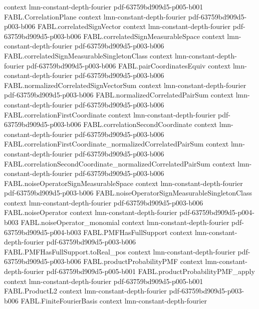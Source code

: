 \begin{theorem}
  {context}
  {lmn-constant-depth-fourier}
  {pdf-63759bd909d5-p005-b001}
\proofstep
  {FABL.CorrelationPlane}
  {context}
  {lmn-constant-depth-fourier}
  {pdf-63759bd909d5-p003-b006}
\proofstep
  {FABL.correlatedSignVector}
  {context}
  {lmn-constant-depth-fourier}
  {pdf-63759bd909d5-p003-b006}
\proofstep
  {FABL.correlatedSignMeasurableSpace}
  {context}
  {lmn-constant-depth-fourier}
  {pdf-63759bd909d5-p003-b006}
\proofstep
  {FABL.correlatedSignMeasurableSingletonClass}
  {context}
  {lmn-constant-depth-fourier}
  {pdf-63759bd909d5-p003-b006}
\proofstep
  {FABL.pairCoordinatesEquiv}
  {context}
  {lmn-constant-depth-fourier}
  {pdf-63759bd909d5-p003-b006}
\proofstep
  {FABL.normalizedCorrelatedSignVectorSum}
  {context}
  {lmn-constant-depth-fourier}
  {pdf-63759bd909d5-p003-b006}
\proofstep
  {FABL.normalizedCorrelatedPairSum}
  {context}
  {lmn-constant-depth-fourier}
  {pdf-63759bd909d5-p003-b006}
\proofstep
  {FABL.correlationFirstCoordinate}
  {context}
  {lmn-constant-depth-fourier}
  {pdf-63759bd909d5-p003-b006}
\proofstep
  {FABL.correlationSecondCoordinate}
  {context}
  {lmn-constant-depth-fourier}
  {pdf-63759bd909d5-p003-b006}
\proofstep
  {FABL.correlationFirstCoordinate_normalizedCorrelatedPairSum}
  {context}
  {lmn-constant-depth-fourier}
  {pdf-63759bd909d5-p003-b006}
\proofstep
  {FABL.correlationSecondCoordinate_normalizedCorrelatedPairSum}
  {context}
  {lmn-constant-depth-fourier}
  {pdf-63759bd909d5-p003-b006}
\proofstep
  {FABL.noiseOperatorSignMeasurableSpace}
  {context}
  {lmn-constant-depth-fourier}
  {pdf-63759bd909d5-p003-b006}
\proofstep
  {FABL.noiseOperatorSignMeasurableSingletonClass}
  {context}
  {lmn-constant-depth-fourier}
  {pdf-63759bd909d5-p003-b006}
\proofstep
  {FABL.noiseOperator}
  {context}
  {lmn-constant-depth-fourier}
  {pdf-63759bd909d5-p004-b003}
\proofstep
  {FABL.noiseOperator_monomial}
  {context}
  {lmn-constant-depth-fourier}
  {pdf-63759bd909d5-p004-b003}
\proofstep
  {FABL.PMFHasFullSupport}
  {context}
  {lmn-constant-depth-fourier}
  {pdf-63759bd909d5-p003-b006}
\proofstep
  {FABL.PMFHasFullSupport.toReal_pos}
  {context}
  {lmn-constant-depth-fourier}
  {pdf-63759bd909d5-p003-b006}
\proofstep
  {FABL.productProbabilityPMF}
  {context}
  {lmn-constant-depth-fourier}
  {pdf-63759bd909d5-p005-b001}
\proofstep
  {FABL.productProbabilityPMF_apply}
  {context}
  {lmn-constant-depth-fourier}
  {pdf-63759bd909d5-p005-b001}
\proofstep
  {FABL.ProductL2}
  {context}
  {lmn-constant-depth-fourier}
  {pdf-63759bd909d5-p003-b006}
\proofstep
  {FABL.FiniteFourierBasis}
  {context}
  {lmn-constant-depth-fourier}

\end{theorem}
